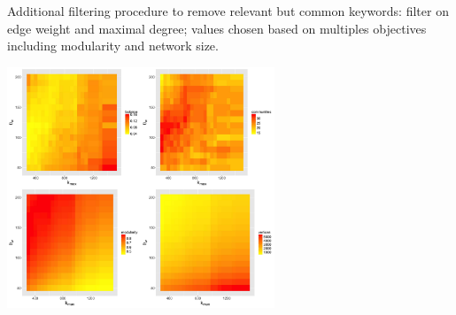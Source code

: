 {\justify

\vspace{-0.5cm}
Additional filtering procedure to remove relevant but common keywords: filter on edge weight and maximal degree; values chosen based on multiples objectives including modularity and network size.

\medskip

\centering

\includegraphics[width=0.6\textwidth]{figures/Fig6.jpg}

}




